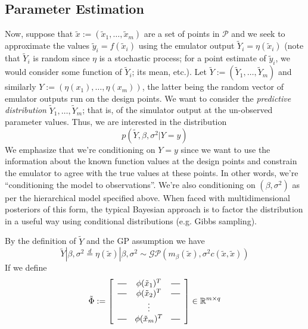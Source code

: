 \documentclass[12pt]{article}
\newcommand{\R}{\mathcal{R}}
\def\R{\mathbb{R}}
\newcommand*{\horzbar}{\rule[.5ex]{2.5ex}{0.5pt}} %
\begin{document}
\subsection{Parameter Estimation}

Now, suppose that $\tilde{x} := (\tilde{x}_1, \dots, \tilde{x}_m)$ are a set of points in $\mathcal{P}$ and we seek to approximate the values $\tilde{y}_i = f(\tilde{x}_i)$ using the 
emulator output $\tilde{Y}_i = \eta(\tilde{x}_i)$ (note that $\tilde{Y}_i$ is random since $\eta$ is a stochastic process; for a point estimate of $\tilde{y}_i$, we would consider some function of $\tilde{Y}_i$; 
its mean, etc.). Let $\tilde{Y} := (\tilde{Y}_1, \dots, \tilde{Y}_m)$ and similarly $Y := (\eta(x_1), \dots, \eta(x_m))$, the latter being the random vector of emulator outputs run on the design points. We want 
to consider the \textit{predictive distribution} $\tilde{Y}_1, \dots, \tilde{Y}_m$; that is, of the simulator output at the un-observed parameter values. Thus, we are interested 
in the distribution 
\[p(\tilde{Y}, \beta, \sigma^2|Y = y)\]
We emphasize that we're conditioning on $Y = y$ since we want to use the information about the known function values at the design points and constrain the emulator to agree with the true values 
at these points. In other words, we're ``conditioning the model to observations''. We're also conditioning on $(\beta, \sigma^2)$ as per the hierarchical model specified above. 
When faced with multidimensional posteriors of this form, the typical Bayesian approach is to factor the distribution in a 
useful way using conditional distributions (e.g. Gibbs sampling). 

By the definition of $\tilde{Y}$ and the GP assumption we have 
\[\tilde{Y}|\beta, \sigma^2 \overset{d}{=} \eta(\tilde{x})|\beta, \sigma^2 \sim \mathcal{GP}(m_\beta (\tilde{x}), \sigma^2 c(\tilde{x}, \tilde{x}))\]
If we define 
\[
\tilde{\Phi} := 
\left[
  \begin{array}{ccc}
    \horzbar & \phi(\tilde{x}_1)^T & \horzbar \\
    \horzbar & \phi(\tilde{x}_2)^T & \horzbar \\
             & \vdots    &          \\
    \horzbar & \phi(\tilde{x}_m)^T & \horzbar
  \end{array}
\right] \in \R^{m \times q}
\]
\end{document}
